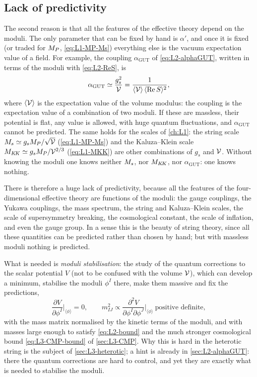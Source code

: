 \subsection{Lack of predictivity}

The second reason is that all the features of the effective theory depend on the moduli. The only parameter that can be fixed by hand is $\alpha'$, and once it is fixed (or traded for $M_{P}$, \cref{eq:L1-MP-Ms}) everything else is the vacuum expectation value of a field. For example, the coupling $\alpha_{\mathrm{GUT}}$ of \cref{eq:L2-alphaGUT}, written in terms of the moduli with \cref{eq:L2-ReS}, is
\begin{equation}
  \alpha_{\mathrm{GUT}} \simeq \frac{g_s^2}{\mathcal{V}} = \frac{1}{\langle\mathcal{V}\rangle\,\langle\mathrm{Re}\,S\rangle^2} ,
  \label{eq:L2-alphaGUT-moduli}
\end{equation}
where $\langle\mathcal{V}\rangle$ is the expectation value of the volume modulus: the coupling is the expectation value of a combination of two moduli. If these are massless, their potential is flat, any value is allowed, with huge quantum fluctuations, and $\alpha_{\mathrm{GUT}}$ cannot be predicted. The same holds for the scales of \cref{ch:L1}: the string scale $M_{s}\simeq g_sM_{P}/\sqrt{\mathcal{V}}$ (\cref{eq:L1-MP-Ms}) and the Kaluza--Klein scale $M_{K\!K}\simeq g_sM_{P}/\mathcal{V}^{2/3}$ (\cref{eq:L1-MKK}) are other combinations of $g_s$ and $\mathcal{V}$. Without knowing the moduli one knows neither $M_{s}$, nor $M_{K\!K}$, nor $\alpha_{\mathrm{GUT}}$: one knows nothing.

There is therefore a huge lack of predictivity, because all the features of the four-dimensional effective theory are functions of the moduli: the gauge couplings, the Yukawa couplings, the mass spectrum, the string and Kaluza--Klein scales, the scale of supersymmetry breaking, the cosmological constant, the scale of inflation, and even the gauge group. In a sense this is the beauty of string theory, since all these quantities can be predicted rather than chosen by hand; but with massless moduli nothing is predicted.

What is needed is \emph{moduli stabilisation}: the study of the quantum corrections to the scalar potential $V$ (not to be confused with the volume $\mathcal{V}$), which can develop a minimum, stabilise the moduli $\phi^I$ there, make them massive and fix the predictions,
\begin{equation}
  \frac{\partial V}{\partial\phi^I}\bigg|_{\langle\phi\rangle} = 0 ,\qquad
  m^2_{IJ}\propto\frac{\partial^2V}{\partial\phi^I\partial\phi^J}\bigg|_{\langle\phi\rangle}\ \text{positive definite} ,
  \label{eq:L2-stabilisation}
\end{equation}
with the mass matrix normalised by the kinetic terms of the moduli, and with masses large enough to satisfy \cref{eq:L2-bound} and the much stronger cosmological bound \cref{eq:L3-CMP-bound} of \cref{sec:L3-CMP}. Why this is hard in the heterotic string is the subject of \cref{sec:L3-heterotic}; a hint is already in \cref{sec:L2-alphaGUT}: there the quantum corrections are hard to control, and yet they are exactly what is needed to stabilise the moduli.
